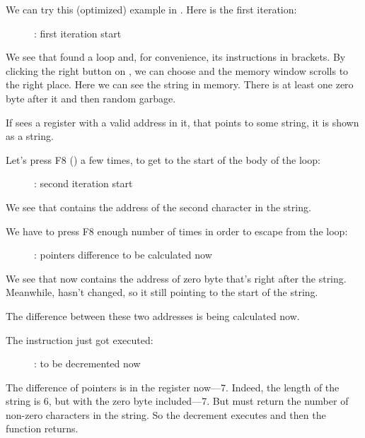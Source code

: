 ﻿\clearpage
{}
\myindex{\olly}

We can try this (optimized) example in \olly.  Here is the first iteration:

\begin{figure}[H]
\centering
{}
\caption{\olly: first iteration start}
\label{fig:strlen_olly_1}
\end{figure}

We see that \olly found a loop and, for convenience,  its instructions in brackets.
By clicking the right button on \EAX, we can choose 
 and the memory window scrolls to the right place.
Here we can see the string  in memory.
There is at least
one zero byte after it and then random garbage.

If \olly sees a register with a valid address in it, that points to some string, 
it is shown as a string.

\clearpage
Let's press F8 (\stepover) a few times, to get to the start of the body of the loop:

\begin{figure}[H]
\centering
{}
\caption{\olly: second iteration start}
\label{fig:strlen_olly_2}
\end{figure}

We see that \EAX contains the address of the second character in the string.

\clearpage

We have to press F8 enough number of times in order to escape from the loop:

\begin{figure}[H]
\centering
{}
\caption{\olly: pointers difference to be calculated now}
\label{fig:strlen_olly_3}
\end{figure}

We see that \EAX now contains the address of zero byte that's right after the string.
Meanwhile, \EDX hasn't changed,
so it still pointing to the start of the string.

The difference between these two addresses is being calculated now.

\clearpage
The \SUB instruction just got executed:

\begin{figure}[H]
\centering
{}
\caption{\olly: \EAX to be decremented now}
\label{fig:strlen_olly_4}
\end{figure}

The difference of pointers is in the \EAX register now---7.
Indeed, the length of the  string is 6, 
but with the zero byte included---7.
But  must return the number of non-zero characters in the string.
So the decrement executes and then the function returns.
